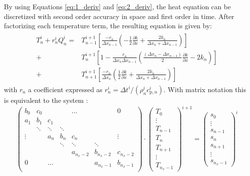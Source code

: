 \documentclass[sn-vancouver, Numbered]{sn-jnl}
\begin{document}
By using Equations \ref{eq:1_deriv} and \ref{eq:2_deriv}, the heat equation can be discretized with second order accuracy in space and first order in time. After factorizing each temperature term, the resulting equation is given by:
\begin{align}
\begin{split}
	T_n^i + r_n^i Q_n^i = &T_{n-1}^{i+1}  \left[ \frac{-r_n}{\Delta x_{n-1}} \left( - \frac{1}{2} \frac{\partial k}{ \partial x} + \frac{2 k_n}{\Delta x_n + \Delta x_{n-1}} \right)  \right] \\
	+ &T_{n}^{i+1} \left[ 1 - \frac{r_n}{\Delta x_{n}\Delta x_{n-1}} \left( \frac{\left(\Delta x_{n}- \Delta x_{n-1} \right)}{2} \frac{\partial k}{ \partial x} - 2 k_n \right) \right] \\
      + &T_{n+1}^{i+1}\left[ \frac{-r_n}{\Delta x_{n}} \left( \frac{1}{2} \frac{\partial k}{ \partial x} + \frac{2 k_n}{\Delta x_n + \Delta x_{n-1}} \right) \right]
\end{split}
    \label{eq:dis_heat}
\end{align}
with $r_n$ a coefficient expressed as $r_n^i = \Delta t^i / (\rho_n^i c_{\mathrm{p}, n}^i)$. With matrix notation this is equivalent to the system :
\begin{equation}
    \begin{pmatrix}
    b_0 & c_0 & &  &\hdots  & & 0  \\
    a_1 & b_1 & c_1 &  \\
      &\ddots & \ddots & \ddots     \\
    \vdots  &  & a_n & b_n & c_n & &  \vdots \\
    & & &\ddots & \ddots & \ddots     \\
    & & &  & a_{n_x-2} & b_{n_x-2} & c_{n_x-2} \\
    0 & &  \hdots & & & a_{n_x-1} & b_{n_x-1}  \\
    \end{pmatrix}
    \cdot
    \begin{pmatrix}
    T_{0} \\
    \vdots \\
    T_{n-1} \\
    T_{n}  \\
    T_{n+1} \\
    \vdots \\
    T_{n_x-1}
    \end{pmatrix}^{i+1}
     = 
     \begin{pmatrix}
        s_{0} \\
        \vdots \\
        s_{n-1} \\
        s_{n}  \\
        s_{n+1} \\
        \vdots \\
        s_{n_x-1}
        \end{pmatrix}^{i}
\end{equation}
\end{document}
